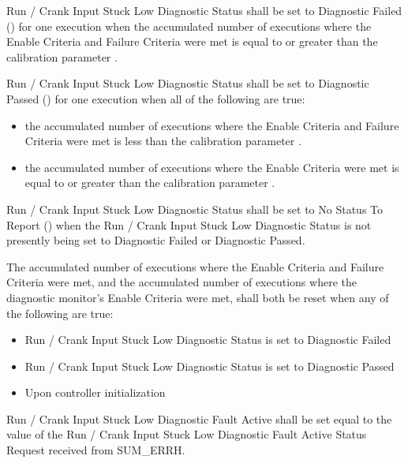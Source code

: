 {Run / Crank Input Stuck Low Diagnostic Status shall be set to Diagnostic Failed () for one execution when the accumulated number of executions where the Enable Criteria and Failure Criteria were met is equal to or greater than the calibration parameter .

Run / Crank Input Stuck Low Diagnostic Status shall be set to Diagnostic Passed () for one execution when all of the following are true:
\begin{itemize}
\item the accumulated number of executions where the Enable Criteria and Failure Criteria were met is less than the calibration parameter .
\item the accumulated number of executions where the Enable Criteria were met is equal to or greater than the calibration parameter .
\end{itemize}

Run / Crank Input Stuck Low Diagnostic Status shall be set to No Status To Report () when the Run / Crank Input Stuck Low Diagnostic Status is not presently being set to Diagnostic Failed or Diagnostic Passed.

The accumulated number of executions where the Enable Criteria and Failure Criteria were met, and the accumulated number of executions where the diagnostic monitor's Enable Criteria were met, shall both be reset when any of the following are true:
\begin{itemize}
\item Run / Crank Input Stuck Low Diagnostic Status is set to Diagnostic Failed
\item Run / Crank Input Stuck Low Diagnostic Status is set to Diagnostic Passed
\item Upon controller initialization
\end{itemize}
}
{    }

{Run / Crank Input Stuck Low Diagnostic Fault Active shall be set equal to the value of the Run / Crank Input Stuck Low Diagnostic Fault Active Status Request received from SUM_ERRH.
}
{}

